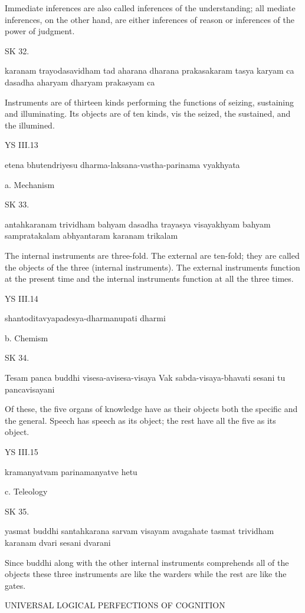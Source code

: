         Immediate inferences are also called inferences of the understanding;
        all mediate inferences, on the other hand, are either inferences of reason or
        inferences of the power of judgment.

SK 32.

karanam trayodasavidham tad aharana dharana prakasakaram
tasya karyam ca dasadha aharyam dharyam prakasyam ca

Instruments are of thirteen kinds performing the functions of
seizing, sustaining and illuminating.
Its objects are of ten kinds, vis
the seized, the sustained, and the illumined.

YS III.13

    etena bhutendriyesu dharma-laksana-vastha-parinama vyakhyata

    a. Mechanism

SK 33.

antahkaranam trividham bahyam dasadha trayasya visayakhyam
bahyam sampratakalam abhyantaram karanam trikalam

The internal instruments are three-fold.
The external are ten-fold; they are called the objects of the three (internal instruments).
The external instruments function at the present time and
the internal instruments function at all the three times.

YS III.14

    shantoditavyapadesya-dharmanupati dharmi

    b. Chemism

SK 34.

Tesam panca buddhi visesa-avisesa-visaya
Vak sabda-visaya-bhavati sesani tu pancavisayani

Of these, the five organs of knowledge have as their objects
both the specific and the general.
Speech has speech as its object;
the rest have all the five as its object.

YS III.15

    kramanyatvam parinamanyatve hetu

    c. Teleology

SK 35.


yasmat buddhi santahkarana sarvam visayam avagahate
tasmat trividham karanam dvari sesani dvarani

Since buddhi along with the other internal instruments
comprehends all of the objects these three instruments are
like the warders while the rest are like the gates.

UNIVERSAL LOGICAL PERFECTIONS OF COGNITION

